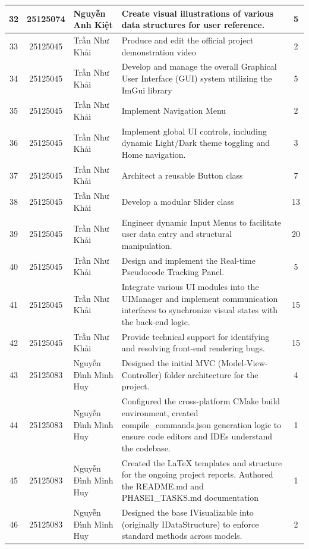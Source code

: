 \begin{center}
\begin{longtable}{|c|c|p{3.2cm}|p{6.5cm}|c|}
32 & 25125074 & Nguyễn Anh Kiệt & Create visual illustrations of various data structures for user reference. & 5 \\ \hline
33 & 25125045 & Trần Như Khải & Produce and edit the official project demonstration video & 2 \\ \hline
34 & 25125045 & Trần Như Khải & Develop and manage the overall Graphical User Interface (GUI) system utilizing the ImGui library & 5 \\ \hline
35 & 25125045 & Trần Như Khải & Implement Navigation Menu & 2 \\ \hline
36 & 25125045 & Trần Như Khải & Implement global UI controls, including dynamic Light/Dark theme toggling and Home navigation. & 3 \\ \hline
37 & 25125045 & Trần Như Khải & Architect a reusable Button class & 7 \\ \hline
38 & 25125045 & Trần Như Khải & Develop a modular Slider class & 13 \\ \hline
39 & 25125045 & Trần Như Khải & Engineer dynamic Input Menus to facilitate user data entry and structural manipulation. & 20 \\ \hline
40 & 25125045 & Trần Như Khải & Design and implement the Real-time Pseudocode Tracking Panel. & 5 \\ \hline
41 & 25125045 & Trần Như Khải & Integrate various UI modules into the UIManager and implement communication interfaces to synchronize visual states with the back-end logic. & 15 \\ \hline
42 & 25125045 & Trần Như Khải & Provide technical support for identifying and resolving front-end rendering bugs. & 15 \\ \hline
43 & 25125083 & Nguyễn Đình Minh Huy & Designed the initial MVC (Model-View-Controller) folder architecture for the project. & 4 \\ \hline
44 & 25125083 & Nguyễn Đình Minh Huy & Configured the cross-platform CMake build environment, created compile\_commands.json generation logic to ensure code editors and IDEs understand the codebase. & 1 \\ \hline
45 & 25125083 & Nguyễn Đình Minh Huy & Created the LaTeX templates and structure for the ongoing project reports. Authored the README.md and PHASE1\_TASKS.md documentation & 1 \\ \hline
46 & 25125083 & Nguyễn Đình Minh Huy & Designed the base IVisualizable into (originally IDataStructure) to enforce standard methods across models. & 2 \\ \hline

\end{longtable}
\end{center}
